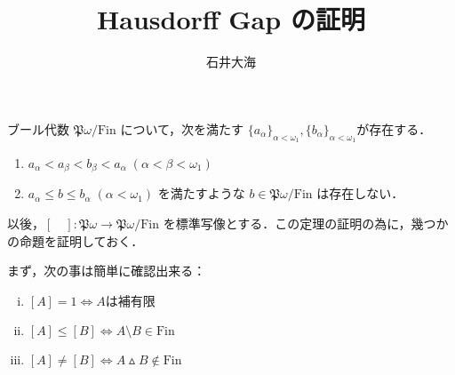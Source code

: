 \documentclass[a4j]{jsarticle}
\title{Hausdorff Gap の証明}
\author{石井大海}
\newcommand{\Fin}{\mathrm{Fin}}
\begin{document}
\maketitle

\begin{theorem}[Hausdorff]
 ブール代数 $\mathfrak{P}\omega / \Fin$ について，次を満たす $\{a_\alpha\}_{\alpha < \omega_1}, \{b_\alpha\}_{\alpha < \omega_1}$が存在する．
 \begin{enumerate}
  \item $a_\alpha < a_\beta < b_\beta < a_\alpha\; (\alpha < \beta < \omega_1)$
  \item $a_\alpha \leq b \leq b_\alpha \; (\alpha < \omega_1)$ を満たすような $b \in \mathfrak{P}\omega / \Fin$ は存在しない．
 \end{enumerate}
\end{theorem}

以後，$[\quad]: \mathfrak{P}\omega \to \mathfrak{P}\omega/\Fin$ を標準写像とする．この定理の証明の為に，幾つかの命題を証明しておく．

まず，次の事は簡単に確認出来る：

\begin{fact}
 \begin{enumerate}[(i)]
  \item $[A] = 1 \Leftrightarrow A \text{は補有限}$
  \item $[A] \leq [B] \Leftrightarrow A \setminus B \in \Fin$
  \item $[A] \neq [B] \Leftrightarrow A \vartriangle B \notin \Fin$
 \end{enumerate}
\end{fact}
\end{document}
